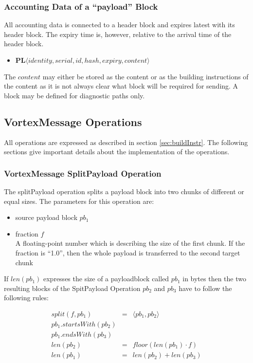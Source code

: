 \subsubsection{Accounting Data of a ``payload'' Block}
All accounting data is connected to a header block and expires latest with its header block. The expiry time is, however, relative to the arrival time of the header block.
\begin{itemize}
	\item $\mathbf{PL}\langle identity, serial, id, hash, expiry, content\rangle$\\
\end{itemize}

The $content$ may either be stored as the content or as the building instructions of the content as it is not always clear what block will be required for sending. A block may be defined for diagnostic paths only.

\subsection{VortexMessage Operations}
All operations are expressed as described in section \ref{sec:buildInstr}. The following sections give important details about the implementation of the operations.

\subsubsection{VortexMessage SplitPayload Operation}
The splitPayload operation splits a payload block into two chunks of different or equal sizes. The parameters for this operation are:

\begin{itemize}
	\item source payload block $pb_1$
	\item fraction $f$\\
	A floating-point number which is describing the size of the first chunk. If the fraction is ``1.0'', then the whole payload is transferred to the second target chunk
\end{itemize}

If $len(pb_1)$ expresses the size of a payloadblock called $pb_1$ in bytes then the two resulting blocks of the SpitPayload Operation $pb_2$ and $pb_3$ have to follow the following rules:

\begin{eqnarray}
split(f, pb_1) & = &\langle pb_1, pb_2 \rangle\\
pb_1.startsWith(pb_2)\\
pb_1.endsWith(pb_3)\\
len(pb_2) & = & floor(len(pb_1)\cdot f)\\
len(pb_1) & = & len(pb_2) + len(pb_3)
\end{eqnarray}

